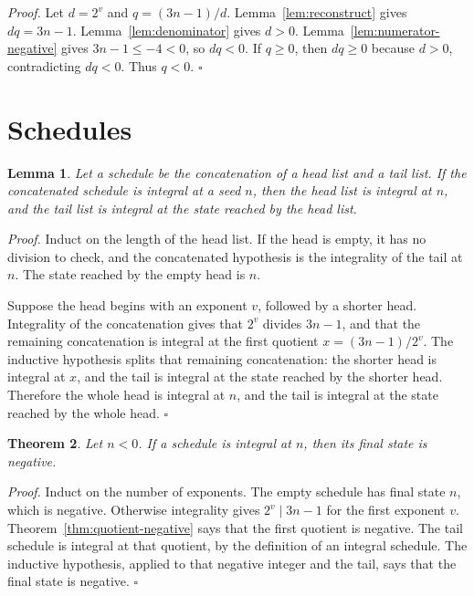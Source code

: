 \documentclass[11pt,letterpaper]{article}
\newtheorem{theorem}{Theorem}
\newtheorem{lemma}[theorem]{Lemma}
\newenvironment{proof}{\noindent\textit{Proof.}}{\hfill\(\square\)}
\begin{document}
\begin{proof}
Let \(d=2^{v}\) and \(q=(3n-1)/d\). Lemma~\ref{lem:reconstruct} gives \(dq=3n-1\). Lemma~\ref{lem:denominator} gives \(d>0\). Lemma~\ref{lem:numerator-negative} gives \(3n-1\le -4<0\), so \(dq<0\). If \(q\ge 0\), then \(dq\ge 0\) because \(d>0\), contradicting \(dq<0\). Thus \(q<0\).
\end{proof}

\section{Schedules}

\begin{lemma}
\label{lem:split}
Let a schedule be the concatenation of a head list and a tail list. If the concatenated schedule is integral at a seed \(n\), then the head list is integral at \(n\), and the tail list is integral at the state reached by the head list.
\end{lemma}

\begin{proof}
Induct on the length of the head list. If the head is empty, it has no division to check, and the concatenated hypothesis is the integrality of the tail at \(n\). The state reached by the empty head is \(n\).

Suppose the head begins with an exponent \(v\), followed by a shorter head. Integrality of the concatenation gives that \(2^{v}\) divides \(3n-1\), and that the remaining concatenation is integral at the first quotient \(x=(3n-1)/2^{v}\). The inductive hypothesis splits that remaining concatenation: the shorter head is integral at \(x\), and the tail is integral at the state reached by the shorter head. Therefore the whole head is integral at \(n\), and the tail is integral at the state reached by the whole head.
\end{proof}

\begin{theorem}
\label{thm:iterate-negative}
Let \(n<0\). If a schedule is integral at \(n\), then its final state is negative.
\end{theorem}

\begin{proof}
Induct on the number of exponents. The empty schedule has final state \(n\), which is negative. Otherwise integrality gives \(2^v\mid 3n-1\) for the first exponent \(v\). Theorem~\ref{thm:quotient-negative} says that the first quotient is negative. The tail schedule is integral at that quotient, by the definition of an integral schedule. The inductive hypothesis, applied to that negative integer and the tail, says that the final state is negative.
\end{proof}
\end{document}
